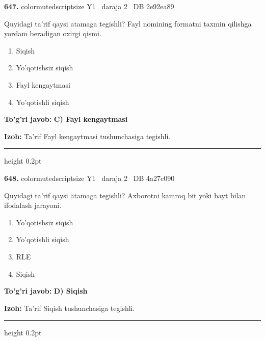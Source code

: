 \documentclass[10pt,a4paper,oneside]{article}
\begin{document}
\noindent\textbf{\color{ink}647.}  {color{muted}scriptsize Y1 \textbullet\ daraja 2 \textbullet\ DB 2e92ea89}
\par
Quyidagi ta'rif qaysi atamaga tegishli? Fayl nomining formatni taxmin qilishga yordam beradigan oxirgi qismi.
\begin{enumerate}[label=\Alph*),leftmargin=9mm]
\item Siqish
\item Yo'qotishsiz siqish
\item Fayl kengaytmasi
\item Yo'qotishli siqish
\end{enumerate}
\begin{tcolorbox}[enhanced,breakable,colback=teal!4,colframe=teal!50!black,boxrule=0.5pt,arc=1.1mm,left=3mm,right=3mm,top=1.7mm,bottom=1.7mm,before skip=2mm,after skip=2mm]
\textbf{\color{teal}To'g'ri javob:} \textbf{C) Fayl kengaytmasi}
\par\smallskip
\textbf{Izoh:} Ta'rif Fayl kengaytmasi tushunchasiga tegishli.
\end{tcolorbox}
\vspace{2mm}\hrule height 0.2pt \vspace{3mm}

\noindent\textbf{\color{ink}648.}  {color{muted}scriptsize Y1 \textbullet\ daraja 2 \textbullet\ DB 4a27c090}
\par
Quyidagi ta'rif qaysi atamaga tegishli? Axborotni kamroq bit yoki bayt bilan ifodalash jarayoni.
\begin{enumerate}[label=\Alph*),leftmargin=9mm]
\item Yo'qotishsiz siqish
\item Yo'qotishli siqish
\item RLE
\item Siqish
\end{enumerate}
\begin{tcolorbox}[enhanced,breakable,colback=teal!4,colframe=teal!50!black,boxrule=0.5pt,arc=1.1mm,left=3mm,right=3mm,top=1.7mm,bottom=1.7mm,before skip=2mm,after skip=2mm]
\textbf{\color{teal}To'g'ri javob:} \textbf{D) Siqish}
\par\smallskip
\textbf{Izoh:} Ta'rif Siqish tushunchasiga tegishli.
\end{tcolorbox}
\vspace{2mm}\hrule height 0.2pt \vspace{3mm}
\end{document}
